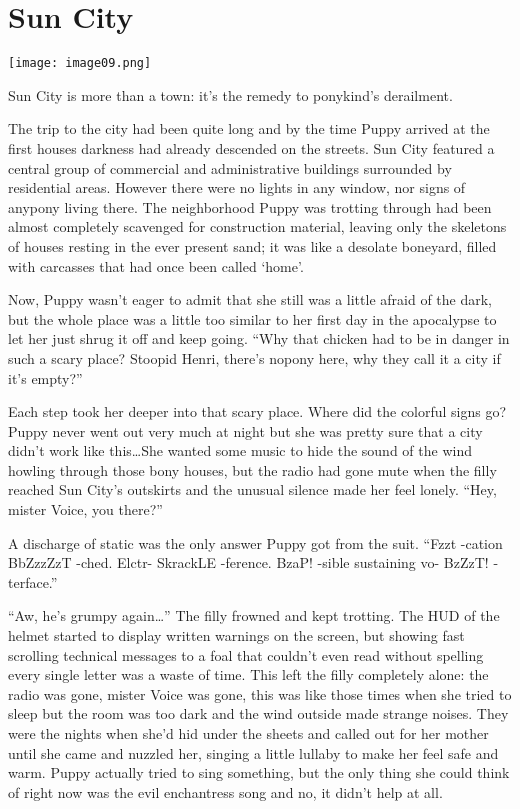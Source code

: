 \chapter{Sun City}

\texttt{[image: image09.png]}


\begin{intro}
    Sun City is more than a town: it's the remedy to ponykind's derailment.
\end{intro}


The trip to the city had been quite long and by the time Puppy arrived at the first houses darkness had already descended on the streets. Sun City featured a central group of commercial and administrative buildings surrounded by residential areas. However there were no lights in any window, nor signs of anypony living there. The neighborhood Puppy was trotting through had been almost completely scavenged for construction material, leaving only the skeletons of houses resting in the ever present sand; it was like a desolate boneyard, filled with carcasses that had once been called `home'.

Now, Puppy wasn't eager to admit that she still was a little afraid of the dark, but the whole place was a little too similar to her first day in the apocalypse to let her just shrug it off and keep going. ``Why that chicken had to be in danger in such a scary place? Stoopid Henri, there's nopony here, why they call it a city if it's empty?''

Each step took her deeper into that scary place. Where did the colorful signs go? Puppy never went out very much at night but she was pretty sure that a city didn't work like this\dots She wanted some music to hide the sound of the wind howling through those bony houses, but the radio had gone mute when the filly reached Sun City's outskirts and the unusual silence made her feel lonely. ``Hey, mister Voice, you there?''

A discharge of static was the only answer Puppy got from the suit. ``{\mt Fzzt -cation BbZzzZzT -ched. Elctr- SkrackLE -ference. BzaP! -sible sustaining vo- BzZzT! -terface.}''

``Aw, he's grumpy again\dots'' The filly frowned and kept trotting. The HUD of the helmet started to display written warnings on the screen, but showing fast scrolling technical messages to a foal that couldn't even read without spelling every single letter was a waste of time. This left the filly completely alone: the radio was gone, mister Voice was gone, this was like those times when she tried to sleep but the room was too dark and the wind outside made strange noises. They were the nights when she'd hid under the sheets and called out for her mother until she came and nuzzled her, singing a little lullaby to make her feel safe and warm. Puppy actually tried to sing something, but the only thing she could think of right now was the evil enchantress song and no, it didn't help at all.

